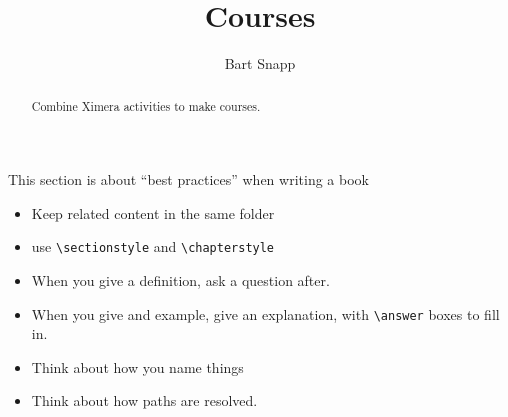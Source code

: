 \documentclass{ximera}
\title{Courses}
\author{Bart Snapp}
\begin{document}
\begin{abstract}
    Combine Ximera activities to make courses.
\end{abstract}
\maketitle

This section is about ``best practices'' when writing a book
\begin{itemize}
    \item Keep related content in the same folder
    \item use \texttt{\textbackslash sectionstyle} and
          \texttt{\textbackslash chapterstyle}
    \item When you give a definition, ask a question after.
    \item When you give and example, give an explanation, with
          \texttt{\textbackslash answer} boxes to fill in.
    \item Think about how you name things
    \item Think about how paths are resolved.
\end{itemize}
\end{document}
